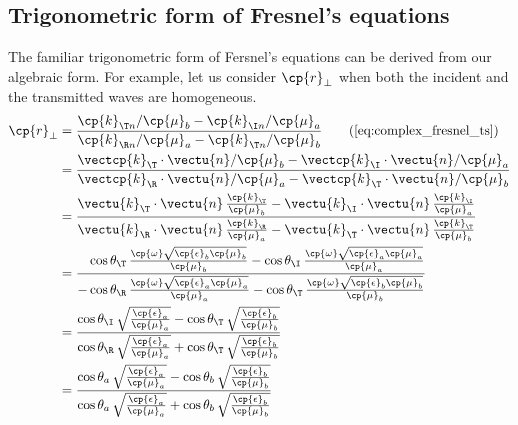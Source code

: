 \subsection{Trigonometric form of Fresnel's equations}
The familiar trigonometric form of Fersnel's equations can be derived from our algebraic form.
For example, let us consider $\cp{r}_\perp$ when both the incident and the transmitted waves are homogeneous.
\begin{subequations}
    \begin{align}
        \cp{r}_\perp 
        &=
        \frac{
            \cp{k}_{\T n} / \cp{\mu}_b - \cp{k}_{\I n} / \cp{\mu}_a
        }{
            \cp{k}_{\R n} / \cp{\mu}_a - \cp{k}_{\T n} / \cp{\mu}_b
        }
        \tag{\ref{eq:complex_fresnel_ts}}
        \\
        &=
        \frac{
            \vectcp{k}_\T \cdot \vectu{n} / \cp{\mu}_b -
            \vectcp{k}_\I \cdot \vectu{n} / \cp{\mu}_a
        }{
            \vectcp{k}_\R \cdot \vectu{n} / \cp{\mu}_a -
            \vectcp{k}_\T \cdot \vectu{n} / \cp{\mu}_b
        }
        \\
        &=
        \frac{
            \vectu{k}_\T \cdot \vectu{n} \, \frac{\cp{k}_\T}{\cp{\mu}_b} -
            \vectu{k}_\I \cdot \vectu{n} \, \frac{\cp{k}_\I}{\cp{\mu}_a}
        }{
            \vectu{k}_\R \cdot \vectu{n} \, \frac{\cp{k}_\R}{\cp{\mu}_a} -
            \vectu{k}_\T \cdot \vectu{n} \, \frac{\cp{k}_\T}{\cp{\mu}_b}
        }
        \\
        &=
        \frac{
            \hphantom{\mathrel{-}}
            \cos\theta_\T \, \frac{\cp{\omega}\sqrt{\cp{\epsilon}_b\cp{\mu}_b}}
                                 {\cp{\mu}_b}
            -
            \cos\theta_\I \, \frac{\cp{\omega}\sqrt{\cp{\epsilon}_a\cp{\mu}_a}}
                                 {\cp{\mu}_a}
        }{
            -
            \cos\theta_\R \, \frac{\cp{\omega}\sqrt{\cp{\epsilon}_a\cp{\mu}_a}}
                                 {\cp{\mu}_a}
            -
            \cos\theta_\T \, \frac{\cp{\omega}\sqrt{\cp{\epsilon}_b\cp{\mu}_b}}
                                 {\cp{\mu}_b}
        }
        \\
        &=
        \frac{
            \cos\theta_\I \, \sqrt{\frac{\cp{\epsilon}_a}{\cp{\mu}_a}}
            -
            \cos\theta_\T \, \sqrt{\frac{\cp{\epsilon}_b}{\cp{\mu}_b}}
        }{
            \cos\theta_\R \, \sqrt{\frac{\cp{\epsilon}_a}{\cp{\mu}_a}}
            +
            \cos\theta_\T \, \sqrt{\frac{\cp{\epsilon}_b}{\cp{\mu}_b}}
        }
        \\
        &=
        \frac{
            \cos\theta_a \, \sqrt{\frac{\cp{\epsilon}_a}{\cp{\mu}_a}}
            -
            \cos\theta_b \, \sqrt{\frac{\cp{\epsilon}_b}{\cp{\mu}_b}}
        }{
            \cos\theta_a \, \sqrt{\frac{\cp{\epsilon}_a}{\cp{\mu}_a}}
            +
            \cos\theta_b \, \sqrt{\frac{\cp{\epsilon}_b}{\cp{\mu}_b}}
        }
    \end{align}
\end{subequations}
